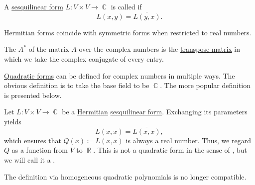 \begin{definition}\label{def:hermitian_form}
  A \hyperref[def:sesquilinear_form]{sesquilinear form} \( L: V \times V \to \BbbC \) is called  if
  \begin{equation*}
    L(x, y) = \overline{L(y, x)}.
  \end{equation*}

  Hermitian forms coincide with symmetric forms when restricted to real numbers.
\end{definition}

\begin{definition}\label{def:conjugate_transpose}
  The  \( A^* \) of the matrix \( A \) over the complex numbers is the \hyperref[def:transpose_matrix]{transpose matrix} in which we take the complex conjugate of every entry.
\end{definition}

\begin{remark}\label{rem:complex_quadratic_form}
  \hyperref[thm:quadratic_forms]{Quadratic forms} can be defined for complex numbers in multiple ways. The obvious definition is to take the base field to be \( \BbbC \). The more popular definition is presented below.

  Let \( L: V \times V \to \BbbC \) be a \hyperref[def:hermitian_form]{Hermitian} \hyperref[def:sesquilinear_form]{sesquilinear form}. Exchanging its parameters yields
  \begin{equation*}
    L(x, x) = \overline {L(x, x)},
  \end{equation*}
  which ensures that \( Q(x) \coloneqq L(x, x) \) is always a real number. Thus, we regard \( Q \) as a function from \( V \) to \( \BbbR \). This is not a quadratic form in the sense of , but we will call it a .

  The definition via homogeneous quadratic polynomials is no longer compatible.
\end{remark}

